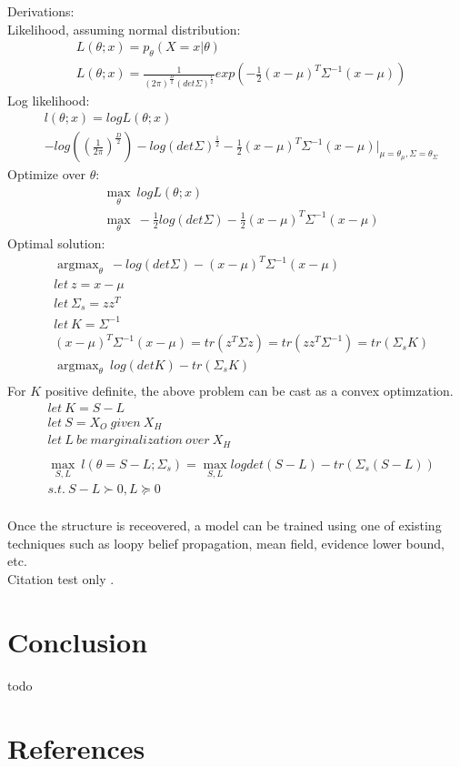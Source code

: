 \documentclass[9pt,technote]{IEEEtran}
\DeclareMathOperator*{\argmax}{argmax}
\begin{document}
Derivations:\\
Likelihood, assuming normal distribution:
\begin{align*}
  &L(\theta;x) = p_{\theta}(X=x | \theta)\\
  &L(\theta;x) = \frac{1}{(2\pi)^{\frac{D}{2}} (det \Sigma)^{\frac{1}{2}}} exp(-\frac{1}{2}(x-\mu)^T\Sigma^{-1}(x-\mu))
\end{align*}
Log likelihood:
\begin{align*}
  & l(\theta;x) = log L(\theta;x)\\
  & -log((\frac{1}{2 \pi})^{\frac{D}{2}}) - log(det \Sigma)^{\frac{1}{2}} - \frac{1}{2}(x-\mu)^T \Sigma^{-1}(x-\mu) \bigg|_{\mu=\theta_{\mu}, \Sigma=\theta_{\Sigma}}
\end{align*}
Optimize over $\theta$:
\begin{align*}
  & \max_{\theta}\ log L(\theta;x)\\
  & \max_{\theta}\ - \frac{1}{2} log(det \Sigma) - \frac{1}{2}(x-\mu)^T \Sigma^{-1}(x-\mu)
\end{align*}
Optimal solution:
\begin{align*}
  & \argmax_{\theta}\ -log(det \Sigma) - (x-\mu)^T \Sigma^{-1}(x-\mu)\\
  &let\ z= x-\mu\\
  &let\ \Sigma_{s}= zz^T\\
  &let\ K = \Sigma^{-1}\\
  &(x-\mu)^T \Sigma^{-1}(x-\mu) = tr(z^T \Sigma z) = tr(zz^T \Sigma^{-1}) = tr(\Sigma_{s} K)\\
  & \argmax_{\theta}\ log(det K) - tr(\Sigma_{s} K)\\
\end{align*}
For $K$ positive definite, the above problem can be cast as a convex optimzation.
\begin{align*}
  &let\ K=S-L\\
  &let\ S = X_O\ given\ X_H\\
  &let\ L\ be\ marginalization\ over\ X_H\\
  \\
  &\max_{S,L}\ l(\theta=S-L; \Sigma_{s}) = \max_{S,L} log det(S-L) - tr(\Sigma_{s}(S-L))\\
  &s.t.\ S-L \succ 0, L \succeq 0\\
\end{align*}

\vfill\null

\pagebreak

Once the structure is receovered, a model can be trained using one of existing techniques such as loopy belief propagation, mean field, evidence lower bound, etc.\\

Citation test only \cite{Chandra_1}.

\vfill\null

\pagebreak

\section*{Conclusion}
todo
\vfill\null

\pagebreak

\section*{References}
\printbibliography[heading=none]
\end{document}
